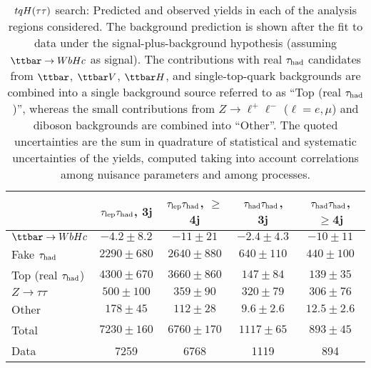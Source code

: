 \begin{table}[htbp]
\caption{
$tqH(\tau\tau)$ search: Predicted and observed yields in each of the analysis regions considered.
The background prediction is shown after the fit to data under the signal-plus-background hypothesis 
(assuming $\Hc$ as signal).
The contributions with real $\tau_{\mathrm{had}}$ candidates from $\ttbar$,  $\ttbar V$, $\ttbar H$, and single-top-quark backgrounds are combined into
a single background source referred to as ``Top (real $\tau_{\mathrm{had}}$)'', whereas the small contributions from 
$Z\to \ell^+\ell^-$ ($\ell = e, \mu$) and diboson backgrounds are combined into ``Other''. 
The quoted uncertainties are the sum in quadrature of statistical and systematic uncertainties of the yields, 
computed taking into account correlations among nuisance parameters and among processes.
}
\small
\begin{center}
\begin{tabular}{l*{4}{c}}
\hline\hline
 & $\tau_{\mathrm{lep}} \tau_{\mathrm{had}}$, 3j & $\tau_{\mathrm{lep}} \tau_{\mathrm{had}}$, $\geq$4j & $\tau_{\mathrm{had}} \tau_{\mathrm{had}}$, 3j &  $\tau_{\mathrm{had}} \tau_{\mathrm{had}}$, $\geq$4j \\
\hline
$\Hc$  &   $ -4.2 \pm 8.2 $ &   $ -11 \pm 21 $ &   $ -2.4 \pm 4.3 $ &   $ -10 \pm 11 $ \\ 
\hline
Fake $\tau_{\mathrm{had}}$  &   $ 2290 \pm 680 $ &   $ 2640 \pm 880 $ &   $ 640 \pm 110 $ &   $ 440 \pm 100 $ \\ 
Top (real $\tau_{\mathrm{had}}$)  &   $ 4300 \pm 670 $ &   $ 3660 \pm 860 $ &   $ 147 \pm 84 $ &   $ 139 \pm 35 $ \\ 
$Z \to \tau\tau$  &   $ 500 \pm 100 $ &   $ 359 \pm 90 $ &   $ 320 \pm 79 $ &   $ 306 \pm 76 $ \\ 
Other  &   $ 178 \pm 45 $ &   $ 112 \pm 28 $ &   $ 9.6 \pm 2.6 $ &   $ 12.5 \pm 2.6 $ \\ 
\hline
Total  &   $ 7230 \pm 160 $ &   $ 6760 \pm 170 $ &   $ 1117 \pm 65 $ &   $ 893 \pm 45 $ \\
\hline
Data & 7259  & 6768  & 1119  & 894 \\ 
\hline\hline    
\end{tabular}
%
\end{center}
\label{tab:Htautau_Postfit_Yields_Unblind_Hc}
\end{table} 


